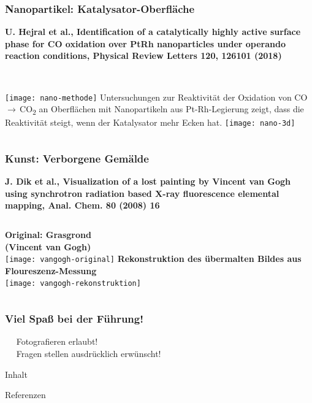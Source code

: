 \documentclass[10pt,t]{beamer}
\begin{document}
\begin{frame}
\frametitle{Nanopartikel: Katalysator-Oberfläche}
\vspace*{-2.6\baselineskip}
\alert{\bfseries\footnotesize U. Hejral et al., Identification of a catalytically highly active surface phase for CO oxidation over PtRh nanoparticles under operando reaction conditions, Physical Review Letters 120, 126101 (2018) \cite{Hejral2018}}
\vspace*{\baselineskip}
\begin{columns}
        ~\\[-\baselineskip]
        \texttt{[image: nano-methode]}
        Untersuchungen zur Reaktivität der Oxidation von
        CO\,$\rightarrow$\,CO\textsubscript{2} an Oberflächen mit Nanopartikeln
        aus Pt-Rh-Legierung zeigt, dass die Reaktivität steigt, wenn der
        Katalysator mehr Ecken hat.
        \vspace*{1ex}
        \texttt{[image: nano-3d]}
\end{columns}
\end{frame}


\begin{frame}
\frametitle{Kunst: Verborgene Gemälde}
\vspace*{-2.6\baselineskip}
\alert{\bfseries\footnotesize J. Dik et al., Visualization of a lost painting by Vincent van Gogh using synchrotron radiation based X-ray fluorescence elemental mapping, Anal. Chem. 80 (2008) 16 \cite{Dik2008}}
\vspace*{0.5\baselineskip}
\begin{columns}
\textbf{Original: \glqq Grasgrond\grqq\\(Vincent van Gogh)} \\[1ex]
    \texttt{[image: vangogh-original]}
\textbf{Rekonstruktion des übermalten Bildes aus Floureszenz-Messung} \\[1ex]
    \texttt{[image: vangogh-rekonstruktion]}
\end{columns}
\vspace*{-8pt}
\end{frame}



\begin{frame}
\frametitle{Viel Spaß bei der Führung!}
\textbullet~~ Fotografieren erlaubt! \\
\textbullet~~ Fragen stellen ausdrücklich erwünscht!
\end{frame}

\begin{frame}{Inhalt}
\tableofcontents
\end{frame}

\begin{frame}[allowframebreaks]{Referenzen}
\printbibliography
\end{frame}
\end{document}
